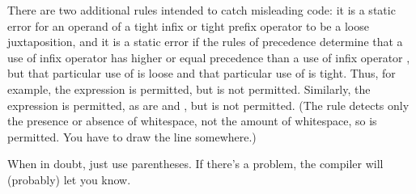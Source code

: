 There are two additional rules intended to catch misleading code:
it is a static error for an operand of a tight infix or tight prefix operator
to be a loose juxtaposition, and
it is a static error if the rules of precedence determine that a use
of infix operator  has higher or equal precedence
than a use of infix operator , but that particular use of
 is loose  and that particular
use of  is tight.  Thus, for example, the expression
 is permitted, but  is not permitted.
Similarly, the expression  is permitted,
as are  and , but
 is not permitted.
(The rule detects only the presence or absence of whitespace, not the
amount of whitespace,
so  is permitted.  You have to draw the line somewhere.)

When in doubt, just use parentheses.  If there's a problem, the compiler will (probably) let you know.
